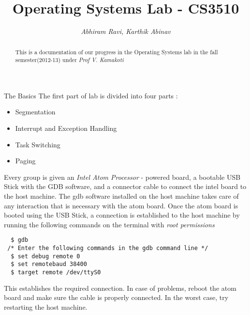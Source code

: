 \documentclass[a4paper,12pt]{report}
\title{\textbf{Operating Systems Lab - CS3510}}
\author{\textit{Abhiram Ravi, Karthik Abinav}}
\begin{document}
\maketitle

\begin{abstract}
This is a documentation of our progress in the Operating Systems lab in the fall semester(2012-13) under \textit{ Prof V. Kamakoti}
\end{abstract}
\begin{section}{The Basics}
 The first part of lab is divided into four parts :
\begin{itemize}
 \item Segmentation
\item Interrupt and Exception Handling
\item Task Switching
\item Paging
\end{itemize}
Every group is given an \textit{Intel Atom Processor} - powered board, a bootable USB Stick with the GDB software, and a connector cable to 
connect the intel board to the host machine. The gdb software installed on the host machine takes care of any interaction that is necessary 
with the atom board. Once the atom board is booted using the USB Stick, a connection is established to the host machine by running 
the following commands on the terminal with \textit{root permissions }
\begin{verbatim}
  $ gdb 
 /* Enter the following commands in the gdb command line */
  $ set debug remote 0
  $ set remotebaud 38400
  $ target remote /dev/ttyS0
\end{verbatim}
This establishes the required connection. In case of problems, reboot the atom board and make sure the cable is 
properly connected. In the worst case, try restarting the host machine.


\end{section}
\end{document}
